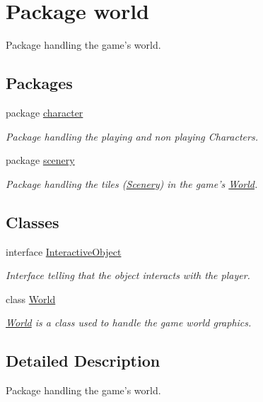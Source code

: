 \hypertarget{namespaceworld}{\section{Package world}
\label{namespaceworld}
}


Package handling the game's world.  


\subsection*{Packages}
\begin{DoxyCompactItemize}
\item 
package \hyperlink{namespaceworld_1_1character}{character}
\begin{DoxyCompactList}\small\item\em Package handling the playing and non playing Characters. \end{DoxyCompactList}\item 
package \hyperlink{namespaceworld_1_1scenery}{scenery}
\begin{DoxyCompactList}\small\item\em Package handling the tiles (\hyperlink{classworld_1_1scenery_1_1_scenery}{Scenery}) in the game's \hyperlink{classworld_1_1_world}{World}. \end{DoxyCompactList}\end{DoxyCompactItemize}
\subsection*{Classes}
\begin{DoxyCompactItemize}
\item 
interface \hyperlink{interfaceworld_1_1_interactive_object}{Interactive\-Object}
\begin{DoxyCompactList}\small\item\em Interface telling that the object interacts with the player. \end{DoxyCompactList}\item 
class \hyperlink{classworld_1_1_world}{World}
\begin{DoxyCompactList}\small\item\em \hyperlink{classworld_1_1_world}{World} is a class used to handle the game world graphics. \end{DoxyCompactList}\end{DoxyCompactItemize}


\subsection{Detailed Description}
Package handling the game's world. 
